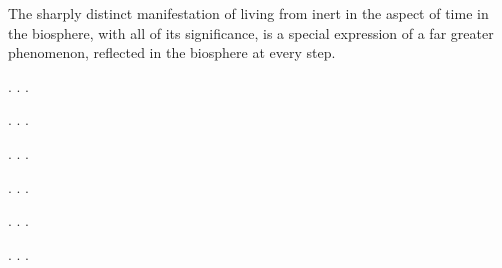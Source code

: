 The sharply distinct manifestation of living from inert in the aspect of time
in the biosphere, with all of its significance, is a special expression of a
far greater phenomenon, reflected in the biosphere at every step.


\Section %

. . .

\Section %

. . .

\Section %

. . .

\Section %

. . .

\Section %

. . .

\Section %

. . .
